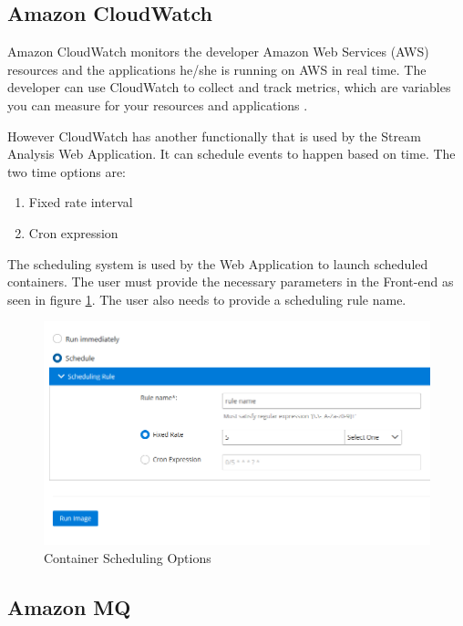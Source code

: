 \newpage

\subsection{Amazon CloudWatch}
\label{chap:04:03:03}

Amazon CloudWatch monitors the developer Amazon Web Services (AWS) resources and the applications he/she is running on AWS in real time. The developer can use CloudWatch to collect and track metrics, which are variables you can measure for your resources and applications \cite{aws-cloudwatch}.

However CloudWatch has another functionally that is used by the Stream Analysis Web Application. It can schedule events to happen based on time. The two time options are:

\begin{enumerate}
	\item Fixed rate interval
	\item Cron expression
\end{enumerate}

The scheduling system is used by the Web Application to launch scheduled containers. The user must provide the necessary parameters in the Front-end as seen in figure \ref{fig:schedulingOptions}. The user also needs to provide a scheduling rule name.

\begin{figure}[h]
	\centering
	\includegraphics[width=1\linewidth]{./images/webapp/schedulingOptions.PNG}
	\caption{Container Scheduling Options}
	\label{fig:schedulingOptions}
\end{figure}

\newpage

\subsection{Amazon MQ}
\label{chap:04:03:04}

